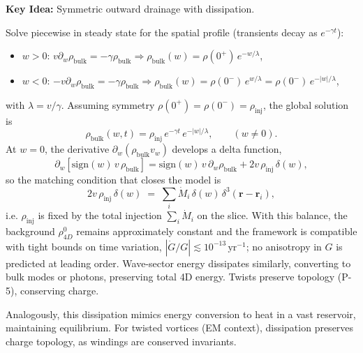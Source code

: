 \textbf{Key Idea:} Symmetric outward drainage with dissipation.

Solve piecewise in steady state for the spatial profile (transients decay as $e^{-\gamma t}$):
\begin{itemize}
\item $w>0$: $v\partial_w\rho_{\text{bulk}}=-\gamma\rho_{\text{bulk}}\Rightarrow \rho_{\text{bulk}}(w)=\rho(0^+)\,e^{-w/\lambda}$,
\item $w<0$: $-v\partial_w\rho_{\text{bulk}}=-\gamma\rho_{\text{bulk}}\Rightarrow \rho_{\text{bulk}}(w)=\rho(0^-)\,e^{w/\lambda}=\rho(0^-)\,e^{-|w|/\lambda}$,
\end{itemize}
with $\lambda=v/\gamma$. Assuming symmetry $\rho(0^+)=\rho(0^-)=\rho_{\text{inj}}$, the global solution is
\begin{equation}
\rho_{\text{bulk}}(w,t)=\rho_{\text{inj}}\,e^{-\gamma t}\,e^{-|w|/\lambda},\qquad (w\neq 0).
\end{equation}
At $w=0$, the derivative $\partial_w(\rho_{\text{bulk}} v_w)$ develops a delta function,
\begin{equation}
\partial_w\!\left[\mathrm{sign}(w)\,v\,\rho_{\text{bulk}}\right]
= \mathrm{sign}(w)\,v\,\partial_w\rho_{\text{bulk}} + 2v\,\rho_{\text{inj}}\,\delta(w),
\end{equation}
so the matching condition that closes the model is
\begin{equation}
2v\,\rho_{\text{inj}}\,\delta(w)\;=\;\sum_i \dot M_i\,\delta(w)\,\delta^3(\mathbf r-\mathbf r_i),
\end{equation}
i.e. $\rho_{\text{inj}}$ is fixed by the total injection $\sum_i\dot M_i$ on the slice. With this balance, the background $\rho_{4D}^0$ remains approximately constant and the framework is compatible with tight bounds on time variation, $|\dot G/G|\lesssim 10^{-13}\,\mathrm{yr}^{-1}$; no anisotropy in $G$ is predicted at leading order. Wave-sector energy dissipates similarly, converting to bulk modes or photons, preserving total 4D energy. Twists preserve topology (P-5), conserving charge.

Analogously, this dissipation mimics energy conversion to heat in a vast reservoir, maintaining equilibrium. For twisted vortices (EM context), dissipation preserves charge topology, as windings are conserved invariants.

